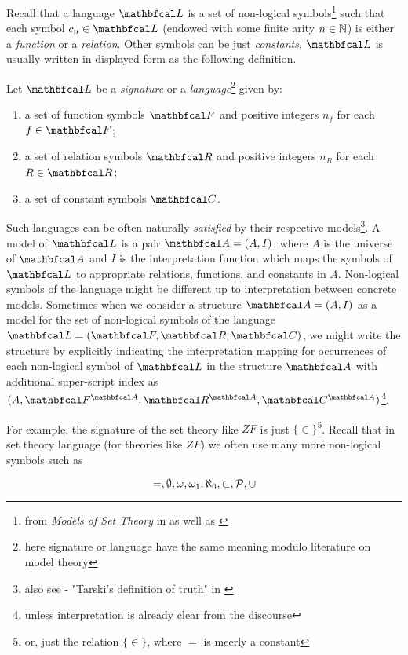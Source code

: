 Recall that a language $\lsign$ is a set of non-logical symbols\footnote{from \textit{Models of Set Theory} in \cite{jech2003set} as well as \cite{marker2002model,hodges1997shorter}} such that each symbol $c_n \in \lsign$ (endowed with some finite arity $n \in \mathbb{N}$) is either a \textit{function} or a \textit{relation}. Other symbols can be just \textit{constants}. $\lsign$ is usually written in displayed form as the following definition. 

\begin{definition}
  Let $\lsign$ be a \textit{signature} or a \textit{language}\footnote{here signature\cite{hodges1997shorter} or language\cite{marker2002model} have the same meaning modulo literature on model theory} given by:
  \begin{enumerate}
    \item a set of function symbols $\Lf$ and positive integers $n_f$ for each $f \in \Lf$;
    \item a set of relation symbols $\Lr$ and positive integers $n_R$ for each $R \in \Lr$;
    \item a set of constant symbols $\Lc$.
  \end{enumerate}
\end{definition}

Such languages can be often naturally \textit{satisfied} by their respective models\footnote{also see - "Tarski's definition of truth" in \cite{jech2003set}}. A model of $\lsign$ is a pair $\LsA = (A, I)$, where $A$ is the universe of $\LsA$ and $I$ is the interpretation function which maps the symbols of $\lsign$ to appropriate relations, functions, and constants in $A$. Non-logical symbols of the language might be different up to interpretation between concrete models. Sometimes when we consider a structure $\LsA = (A, I)$ as a model for the set of non-logical symbols of the language $\lsign = (\Lf, \Lr, \Lc)$, we might write the structure by explicitly indicating the interpretation mapping for occurrences of each non-logical symbol of $\lsign$ in the structure $\LsA$ with additional super-script index as $(A, \Lf^{\LsA}, \Lr^{\LsA}, \Lc^{\LsA})$\footnote{unless interpretation is already clear from the discourse}.

For example, the signature of the set theory like $ZF$ is just $\{\in\}$\footnote{or, just the relation $\{\in\}$, where $=$ is meerly a constant}. Recall that in set theory language (for theories like $ZF$) we often use many more non-logical symbols such as 

\[ =, \emptyset, \omega, \omega_1, \aleph_0, \subset, \mathcal{P}, \cup \]

